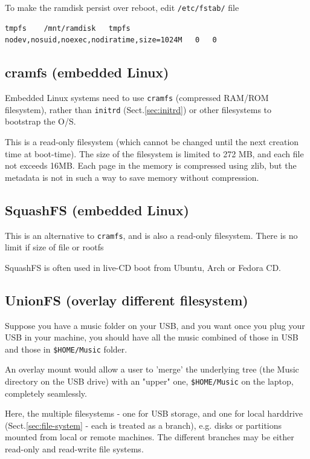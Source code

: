 To make the ramdisk persist over reboot, edit \verb!/etc/fstab/! file 
\begin{verbatim}
tmpfs    /mnt/ramdisk   tmpfs    nodev,nosuid,noexec,nodiratime,size=1024M   0   0
\end{verbatim}


\subsection{cramfs (embedded Linux)}
\label{sec:cramfs}

Embedded Linux systems need to use \verb!cramfs! (compressed RAM/ROM
filesystem), rather than \verb!initrd! (Sect.\ref{sec:initrd}) or other
filesystems to bootstrap the O/S. 

This is a read-only filesystem (which cannot be changed until the next creation
time at boot-time). The size of the filesystem is limited to 272 MB, and each
file not exceeds 16MB. Each page in the memory is compressed using zlib, but the
metadata is not in such a way to save memory without compression.

\subsection{SquashFS (embedded Linux)}
\label{sec:SquashFS}

This is an alternative to \verb!cramfs!, and is also a read-only filesystem. 
There is no limit if size of file or rootfs

SquashFS is often used in live-CD boot from Ubuntu, Arch or Fedora CD.

\subsection{UnionFS (overlay different filesystem)}
\label{sec:unionfs}

Suppose you have a music folder on your USB, and you want once you plug your USB
in your machine, you should have all the music combined of those in USB and
those in \verb!$HOME/Music! folder.

An overlay mount would allow a user to 'merge' the underlying tree (the Music
directory on the USB drive) with an "upper" one, \verb!$HOME/Music! on the
laptop, completely seamlessly.

Here, the multiple filesystems - one for USB storage, and one for local
harddrive (Sect.\ref{sec:file-system} - each is treated as a branch),
e.g. disks or partitions mounted from local or remote machines. The different
branches may be either read-only and read-write file systems.

